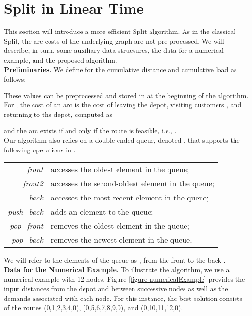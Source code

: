 \documentclass[11pt]{article}
\newcommand{\blue}[1]{{#1}}
\begin{document}
\section{Split in Linear Time}
\label{sectionLinear}

This section will introduce a more efficient Split algorithm.
\blue{As in the classical Split, the arc costs of the underlying graph are not pre-processed.
We will describe, in turn, some auxiliary data structures, the data for a numerical example, and the proposed algorithm}. \\

\noindent
\textbf{Preliminaries.} We define for  the cumulative distance  and cumulative load  as follows:


These values can be preprocessed and stored in  at the beginning of the algorithm.
For , the cost  of an arc  is the cost of leaving the depot, visiting customers , and returning to the depot, computed as

and the arc  exists if and only if the route is feasible, i.e., . \\

Our algorithm also relies on a double-ended queue, denoted , that supports the following operations in :

\noindent
\hspace*{1cm}
\begin{tabular}{r@{ -- }l}
\emph{front} &accesses the oldest element in the queue; \\
\emph{front2} &accesses the second-oldest element in the queue; \\
\emph{back} &accesses the most recent element in the queue; \\
\emph{push\_back} &adds an element to the queue; \\
\emph{pop\_front} &removes the oldest element in the queue; \\
\emph{pop\_back} &removes the newest element in the queue. \\
\end{tabular}

\noindent
We will refer to the elements of the queue as , from the front  to the back . \\

\noindent
\textbf{Data for the Numerical Example.}
To illustrate the algorithm, we use a numerical example with 12 nodes.
Figure \ref{figure-numericalExample} provides the input distances from the depot and between successive nodes as well as the demands associated with each node.  For this instance, the best solution consists of the routes (0,1,2,3,4,0), (0,5,6,7,8,9,0), and (0,10,11,12,0).
\end{document}

